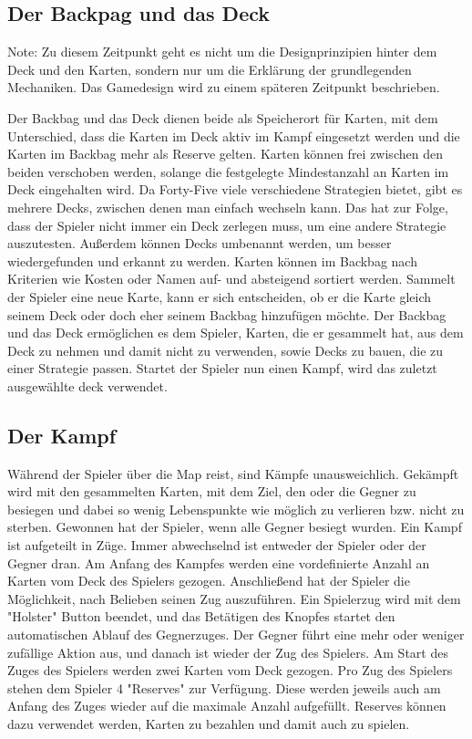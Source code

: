 \subsection{Der Backpag und das Deck}\label{backpack_and_deck}
\begin{infoBox}
Note: Zu diesem Zeitpunkt geht es nicht um die Designprinzipien hinter dem Deck und den Karten,
sondern nur um die Erklärung der grundlegenden Mechaniken. Das Gamedesign wird zu einem späteren Zeitpunkt beschrieben.
\end{infoBox}
Der Backbag und das Deck dienen beide als Speicherort für Karten, mit dem Unterschied, dass die Karten im Deck aktiv im
Kampf eingesetzt werden und die Karten im Backbag mehr als Reserve gelten.
Karten können frei zwischen den beiden verschoben werden, solange die festgelegte Mindestanzahl an Karten im Deck eingehalten wird.
Da Forty-Five viele verschiedene Strategien bietet, gibt es mehrere Decks, zwischen denen man einfach wechseln kann.
Das hat zur Folge, dass der Spieler nicht immer ein Deck zerlegen muss, um eine andere Strategie auszutesten.
Außerdem können Decks umbenannt werden, um besser wiedergefunden und erkannt zu werden.
Karten können im Backbag nach Kriterien wie Kosten oder Namen auf- und absteigend sortiert werden.
Sammelt der Spieler eine neue Karte, kann er sich entscheiden, ob er die Karte gleich seinem Deck oder doch eher seinem
Backbag hinzufügen möchte.
Der Backbag und das Deck ermöglichen es dem Spieler, Karten, die er gesammelt hat, aus dem Deck zu nehmen und damit
nicht zu verwenden, sowie Decks zu bauen, die zu einer Strategie passen.
Startet der Spieler nun einen Kampf, wird das zuletzt ausgewählte deck verwendet.


\subsection{Der Kampf}\label{backpack_and_deck}

Während der Spieler über die Map reist, sind Kämpfe unausweichlich.
Gekämpft wird mit den gesammelten Karten, mit dem Ziel, den oder die Gegner zu besiegen und dabei so wenig Lebenspunkte
wie möglich zu verlieren bzw. nicht zu sterben. Gewonnen hat der Spieler, wenn alle Gegner besiegt wurden.
Ein Kampf ist aufgeteilt in Züge. Immer abwechselnd ist entweder der Spieler oder der Gegner dran. Am Anfang des Kampfes
werden eine vordefinierte Anzahl an Karten vom Deck des Spielers gezogen. %
Anschließend hat der Spieler die Möglichkeit, nach Belieben seinen Zug auszuführen. Ein Spielerzug wird mit dem "Holster"
Button beendet, und das Betätigen des Knopfes startet den automatischen Ablauf des Gegnerzuges. Der Gegner führt eine mehr oder weniger zufällige Aktion aus, und danach ist wieder der Zug des Spielers.
Am Start des Zuges des Spielers werden zwei Karten vom Deck gezogen. Pro Zug des Spielers stehen dem Spieler 4 "Reserves"
zur Verfügung. Diese werden jeweils auch am Anfang des Zuges wieder auf die maximale Anzahl aufgefüllt.
Reserves können dazu verwendet werden, Karten zu bezahlen und damit auch zu spielen.


